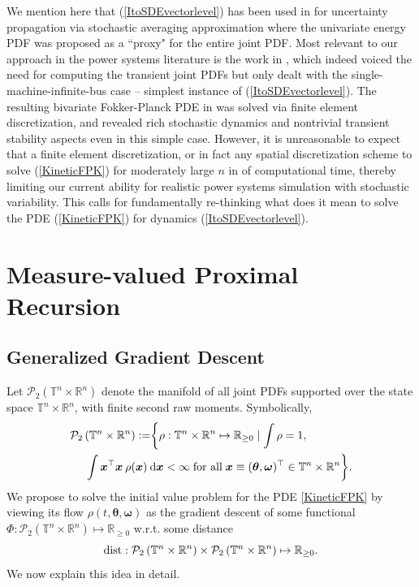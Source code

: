 \documentclass[10pt,twocolumn]{IEEEtran}
\newcommand{\differential}{{\rm{d}}}
\newcommand{\red}{\color{red}}
\begin{document}
We mention here that (\ref{ItoSDEvectorlevel}) has been used in \cite{ju2018analytical,ju2018stochastic} for uncertainty propagation via stochastic averaging approximation where the univariate energy PDF was proposed as a ``proxy" for the entire joint PDF. Most relevant to our approach in the power systems literature is the work in \cite{wang2013fokker}, which indeed voiced the need for computing the transient joint PDFs but only dealt with the single-machine-infinite-bus case -- simplest instance of (\ref{ItoSDEvectorlevel}). The resulting bivariate Fokker-Planck PDE in \cite{wang2013fokker} was solved via finite element discretization, and revealed rich stochastic dynamics and nontrivial transient stability aspects even in this simple case. However, it is unreasonable to expect that a finite element discretization, or in fact any spatial discretization scheme to solve (\ref{KineticFPK}) for moderately large $n$ in {\red{minutes}} of computational time, thereby limiting our current ability for realistic power systems simulation with stochastic variability. This calls for fundamentally re-thinking what does it mean to solve the PDE (\ref{KineticFPK}) for dynamics (\ref{ItoSDEvectorlevel}).


\section{Measure-valued Proximal Recursion}\label{sec:prox}
\subsection{Generalized Gradient Descent}\label{subsec:GenGradDescent}
Let $\mathcal{P}_{2}\left(\mathbb{T}^{n} \times \mathbb{R}^{n}\right)$ denote the manifold of all joint PDFs supported over the state space $\mathbb{T}^{n} \times \mathbb{R}^{n}$, with finite second raw moments. Symbolically,
\begin{align}
\mathcal{P}_{2}\left(\mathbb{T}^{n} \times \mathbb{R}^{n}\right) := &\bigg\{\rho : \mathbb{T}^{n} \times \mathbb{R}^{n} \mapsto \mathbb{R}_{\geq 0} \mid \int \rho = 1,\nonumber\\
&\hspace*{-0.8in}\int\bm{x}^{\top}\bm{x}\:\rho(\bm{x})\:\differential\bm{x} <\infty\; \text{for all}\;\bm{x}\equiv(\bm{\theta},\bm{\omega})^{\top}\in\mathbb{T}^{n} \times \mathbb{R}^{n} \bigg\}.
\label{DefP2}	
\end{align}
We propose to solve the initial value problem for the PDE \eqref{KineticFPK} by viewing its flow $\rho(t,\bm{\theta},\bm{\omega})$ as the gradient descent of some functional $\Phi:\mathcal{P}_{2}\left(\mathbb{T}^{n} \times \mathbb{R}^{n}\right)\mapsto \mathbb{R}_{\geq 0}$ w.r.t. some distance 
\[{\rm{dist}}:\mathcal{P}_{2}\left(\mathbb{T}^{n} \times \mathbb{R}^{n}\right)\times\mathcal{P}_{2}\left(\mathbb{T}^{n} \times \mathbb{R}^{n}\right)\mapsto\mathbb{R}_{\geq 0}.\]
We now explain this idea in detail.
\end{document}
